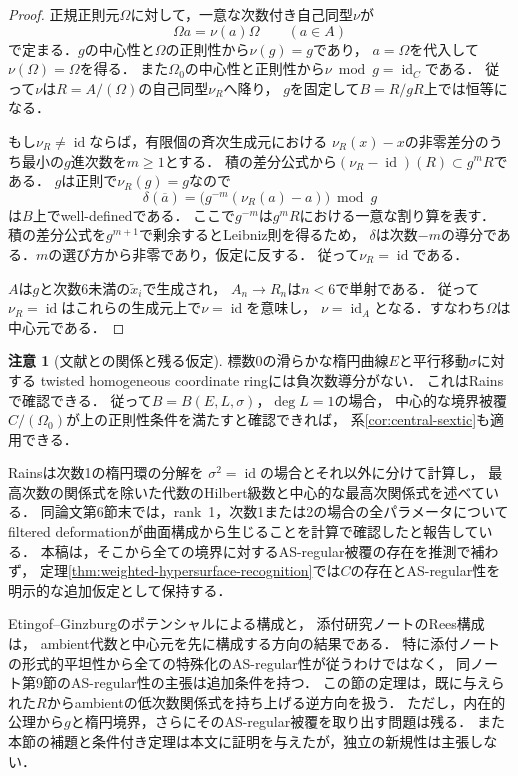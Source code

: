 \documentclass[11pt,a4paper]{ltjsarticle}
\theoremstyle{definition}
\newtheorem{remark}[theorem]{注意}
\newcommand{\id}{\operatorname{id}}
\begin{document}
\begin{proof}
正規正則元$\Omega$に対して，一意な次数付き自己同型$\nu$が
\[
 \Omega a=\nu(a)\Omega\qquad(a\in A)
\]
で定まる．$g$の中心性と$\Omega$の正則性から$\nu(g)=g$であり，
$a=\Omega$を代入して$\nu(\Omega)=\Omega$を得る．
また$\Omega_0$の中心性と正則性から$\nu\bmod g=\id_C$である．
従って$\nu$は$R=A/(\Omega)$の自己同型$\nu_R$へ降り，
$g$を固定して$B=R/gR$上では恒等になる．

もし$\nu_R\ne\id$ならば，有限個の斉次生成元における
$\nu_R(x)-x$の非零差分のうち最小の$g$進次数を$m\geq1$とする．
積の差分公式から$(\nu_R-\id)(R)\subset g^mR$である．
$g$は正則で$\nu_R(g)=g$なので
\[
 \delta(\overline a)
 =\bigl(g^{-m}(\nu_R(a)-a)\bigr)\bmod g
\]
は$B$上でwell-definedである．
ここで$g^{-m}$は$g^mR$における一意な割り算を表す．
積の差分公式を$g^{m+1}$で剰余するとLeibniz則を得るため，
$\delta$は次数$-m$の導分である．$m$の選び方から非零であり，仮定に反する．
従って$\nu_R=\id$である．

$A$は$g$と次数6未満の$\widetilde x_i$で生成され，
$A_n\to R_n$は$n<6$で単射である．
従って$\nu_R=\id$はこれらの生成元上で$\nu=\id$を意味し，
$\nu=\id_A$となる．すなわち$\Omega$は中心元である．
\end{proof}

\begin{remark}[文献との関係と残る仮定]
標数0の滑らかな楕円曲線$E$と平行移動$\sigma$に対する
twisted homogeneous coordinate ringには負次数導分がない．
これはRains\cite[Lemma~2.11 and the proof of Theorem~2.12]{RainsFiltered}で確認できる．
従って$B=B(E,L,\sigma)$，$\deg L=1$の場合，
中心的な境界被覆$C/(\Omega_0)$が上の正則性条件を満たすと確認できれば，
系\ref{cor:central-sextic}も適用できる．

Rains\cite[Example~3.1]{RainsFiltered}は次数1の楕円環の分解を
$\sigma^2=\id$の場合とそれ以外に分けて計算し，
最高次数の関係式を除いた代数のHilbert級数と中心的な最高次関係式を述べている．
同論文第6節末では，rank~1，次数1または2の場合の全パラメータについて
filtered deformationが曲面構成から生じることを計算で確認したと報告している．
本稿は，そこから全ての境界に対するAS-regular被覆の存在を推測で補わず，
定理\ref{thm:weighted-hypersurface-recognition}では$C$の存在とAS-regular性を
明示的な追加仮定として保持する．

Etingof--Ginzburg\cite[Theorem~3.3.2]{EG}のポテンシャルによる構成と，
添付研究ノート\cite[Sections~8--9]{PoissonNote}のRees構成は，
ambient代数と中心元を先に構成する方向の結果である．
特に添付ノートの形式的平坦性から全ての特殊化のAS-regular性が従うわけではなく，
同ノート第9節のAS-regular性の主張は追加条件を持つ．
この節の定理は，既に与えられた$R$からambientの低次数関係式を持ち上げる逆方向を扱う．
ただし，内在的公理から$g$と楕円境界，さらにそのAS-regular被覆を取り出す問題は残る．
また本節の補題と条件付き定理は本文に証明を与えたが，独立の新規性は主張しない．
\end{remark}
\end{document}
